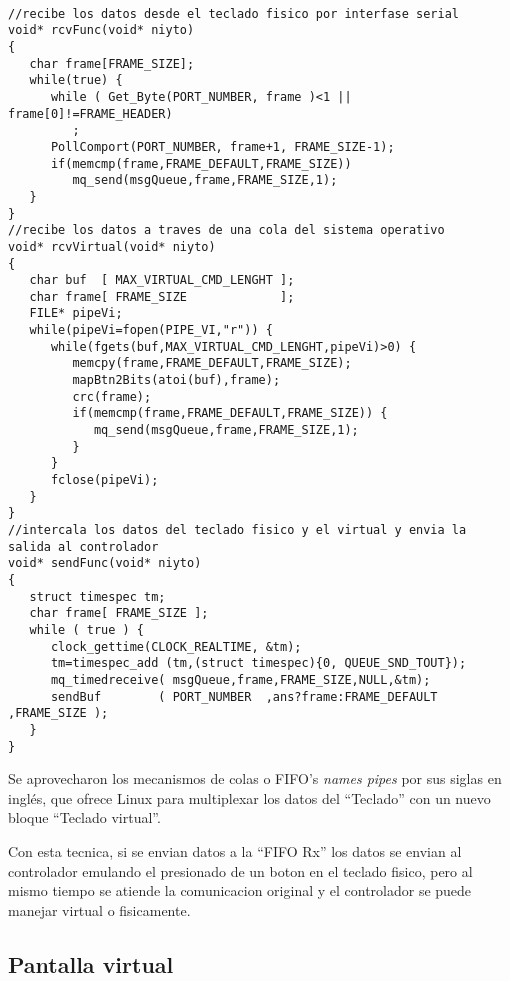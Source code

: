 \begin{lstlisting}[label=cod:handheld1,caption=Funcion de intercalado de datos entre el teclado fisico y el virtual utilizando colas.]

//recibe los datos desde el teclado fisico por interfase serial
void* rcvFunc(void* niyto)
{
   char frame[FRAME_SIZE];
   while(true) {
      while ( Get_Byte(PORT_NUMBER, frame )<1 || frame[0]!=FRAME_HEADER)
         ;
      PollComport(PORT_NUMBER, frame+1, FRAME_SIZE-1);
      if(memcmp(frame,FRAME_DEFAULT,FRAME_SIZE))
         mq_send(msgQueue,frame,FRAME_SIZE,1);
   }
}
//recibe los datos a traves de una cola del sistema operativo
void* rcvVirtual(void* niyto)
{
   char buf  [ MAX_VIRTUAL_CMD_LENGHT ];
   char frame[ FRAME_SIZE             ];
   FILE* pipeVi;
   while(pipeVi=fopen(PIPE_VI,"r")) {
      while(fgets(buf,MAX_VIRTUAL_CMD_LENGHT,pipeVi)>0) {
         memcpy(frame,FRAME_DEFAULT,FRAME_SIZE);
         mapBtn2Bits(atoi(buf),frame);
         crc(frame);
         if(memcmp(frame,FRAME_DEFAULT,FRAME_SIZE)) {
            mq_send(msgQueue,frame,FRAME_SIZE,1);
         }
      }
      fclose(pipeVi);
   }
}
//intercala los datos del teclado fisico y el virtual y envia la salida al controlador 
void* sendFunc(void* niyto)
{
   struct timespec tm;
   char frame[ FRAME_SIZE ];
   while ( true ) {
      clock_gettime(CLOCK_REALTIME, &tm);
      tm=timespec_add (tm,(struct timespec){0, QUEUE_SND_TOUT});
      mq_timedreceive( msgQueue,frame,FRAME_SIZE,NULL,&tm);
      sendBuf        ( PORT_NUMBER  ,ans?frame:FRAME_DEFAULT ,FRAME_SIZE );
   }
}
\end{lstlisting}

   Se aprovecharon los mecanismos de colas o FIFO's \textit{names pipes} por sus siglas en inglés, que ofrece Linux para multiplexar los datos del ``Teclado'' con un nuevo bloque ``Teclado virtual''.\par
      Con esta tecnica, si se envian datos a la ``FIFO Rx'' los datos se envian al controlador emulando el presionado de un boton en el teclado fisico, pero al mismo tiempo se atiende la comunicacion original y el controlador se puede manejar virtual o fisicamente.
      
\subsection{Pantalla virtual}

